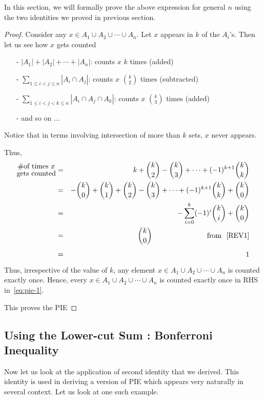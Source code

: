 In this section, we will formally prove the above expression for general $n$ using the two identities we proved in previous section.
\begin{proof}
Consider any $x\in A_1\cup A_2\cup\cdots\cup A_n$. Let $x$ appears in $k$ of the $A_i$'s. Then let us see how $x$ gets counted
\begin{itemize}
    \item[-] $|A_1|+|A_2|+\cdots +|A_n|$: counts $x$ $k$ times (added)
    \item[-] $\sum_{1\le i<j\le n}|A_i\cap A_j|$: counts $x$ ${k\choose 2}$ times (subtracted)
    \item[-] $\sum_{1\le i<j<k\le n}|A_i\cap A_j\cap A_k|$: counts $x$ ${k\choose 3}$ times (added) 
    \item[-] and so on $\ldots$
\end{itemize}
Notice that in terms involving intersection of more than $k$ sets, $x$ never appears.

Thus, 
\begin{eqnarray*} 
{\Large\substack{\# \text{of times $x$}\\ \text{gets counted}}} &=& k+{k\choose 2}-{k\choose 3}+\cdots +(-1)^{k+1}{k\choose k}\\
&=&-{k\choose 0}+{k\choose 1}+{k\choose 2}-{k\choose 3}+\cdots +(-1)^{k+1}{k\choose k}+{k\choose 0}\\
&=&-\sum_{i=0}^k(-1)^{i}{k\choose i}+{k\choose 0}\\
&=&{k\choose 0} ~~~~~~~~~~~~~~~~~~~~~~~\text{from ~\eqref{REV1}}\\
&=& 1
\end{eqnarray*}
Thus, irrespective of the value of $k$, any element $x\in A_1\cup A_2\cup\cdots\cup A_n$ is counted exactly once. Hence, every $x\in A_1\cup A_2\cup\cdots\cup A_n$ is counted exactly once in RHS in~\eqref{eq:pie-1}.

This proves the PIE
\end{proof}

\subsection{Using the Lower-cut Sum : Bonferroni Inequality}

Now let us look at the application of second identity that we derived. This identity is used in deriving a version of PIE which appears very naturally in several context. Let us look at one such example.

